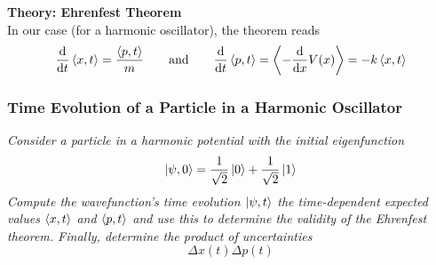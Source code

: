 \documentclass[11pt, a4paper]{article}
\newcommand{\eqtext}[1]{\qquad \text{#1} \qquad}
\begin{document}
\textbf{Theory: Ehrenfest Theorem}\\
In our case (for a harmonic oscillator), the theorem reads
\begin{equation*}
	\dv{t}\ev{x, t} = \frac{\ev{p, t}}{m} \eqtext{and} \dv{t}\ev{p, t} = \ev{-\dv{x}V(x)} = -k\ev{x, t}
\end{equation*}


\subsubsection{Time Evolution of a Particle in a Harmonic Oscillator}
\textit{Consider a particle in a harmonic potential with the initial eigenfunction}
\begin{equation*}
	\ket{\psi, 0} = \frac{1}{\sqrt{2}}\ket{0} + \frac{1}{\sqrt{2}}\ket{1}
\end{equation*}
\textit{Compute the wavefunction's time evolution $ \ket{\psi, t} $ the time-dependent expected values $ \ev{x, t} $ and $ \ev{p, t} $ and use this to determine the validity of the Ehrenfest theorem. Finally, determine the product of uncertainties}
\begin{equation*}
	\Delta x(t) \Delta p(t)
\end{equation*}
\end{document}
